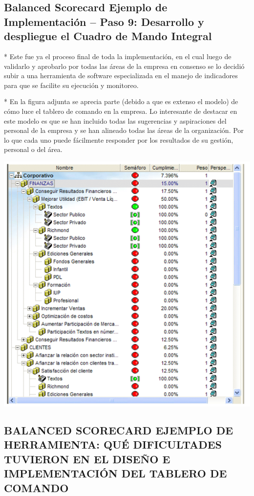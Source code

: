 \subsection{Balanced Scorecard Ejemplo de Implementación – Paso 9: Desarrollo y despliegue el Cuadro de Mando Integral}
\item {* Este fue ya el proceso final de toda la implementación, en el cual luego de validarlo y aprobarlo por todas las áreas de la empresa en consenso se lo decidió subir a una herramienta de software especializada en el manejo de indicadores para que se facilite su ejecución y monitoreo.

* En la figura adjunta se aprecia parte (debido a que es extenso el modelo) de cómo luce el tablero de comando en la empresa. Lo interesante de destacar en este modelo es que se han incluido todas las sugerencias y aspiraciones del personal de la empresa y se han alineado todas las áreas de la organización. Por lo que cada uno puede fácilmente responder por los resultados de su gestión, personal o del área.}
\begin{center}
\includegraphics[width=15cm]{./Imagenes/img02.png}
\end{center}



\begin{center}
\vspace*{0.1in}
\begin{Large}
\section{BALANCED SCORECARD EJEMPLO DE HERRAMIENTA: QUÉ DIFICULTADES TUVIERON EN EL DISEÑO E IMPLEMENTACIÓN DEL TABLERO DE COMANDO} \\
\end{Large}
\end{center}

